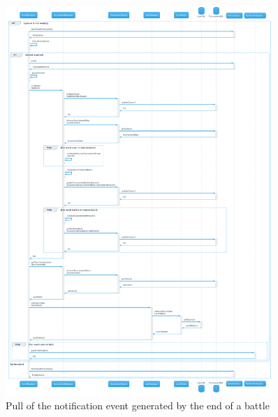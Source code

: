 \begin{figure}[H]
    \hspace{0.5cm}
    \includegraphics[width=0.9\textwidth]{Diagrams/sequence/close_battle_pull.png}
    \caption{Pull of the notification event generated by the end of a battle}
\end{figure}

